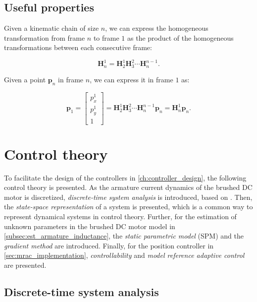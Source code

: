 \subsection*{Useful properties}

Given a kinematic chain of size $n$, we can express the homogeneous transformation from frame $n$ to frame $1$ as the product of the homogeneous transformations between each consecutive frame:

\begin{equation}
    \label{eq:theory_homogeneous_transformation_chain}
    \mathbf{H}_n^1 = \mathbf{H}_2^1 \mathbf{H}_3^2 \cdots \mathbf{H}_n^{n-1}.
\end{equation}

Given a point $\mathbf{p}_n$ in frame $n$, we can express it in frame $1$ as:

\begin{equation}
    \label{eq:theory_homogeneous_transformation_chain_application}
    \mathbf{p}_1 = \begin{bmatrix}
        p_x^1 \\
        p_y^1 \\
        1
    \end{bmatrix} = \mathbf{H}_2^1 \mathbf{H}_3^2 \cdots \mathbf{H}_n^{n-1} \mathbf{p}_n = \mathbf{H}_n^1 \mathbf{p}_n.
\end{equation}

\section{Control theory}%
\label{sec:theory_control}

To facilitate the design of the controllers in \cref{ch:controller_design}, the following control theory is presented. As the armature current dynamics of the brushed DC motor is discretized, \textit{discrete-time system analysis} is introduced, based on \cite{proakisDigitalSignalProcessing2014}. Then, the \textit{state-space representation} of a system is presented, which is a common way to represent dynamical systems in control theory. Further, for the estimation of unknown parameters in the brushed DC motor model in \cref{subsec:est_armature_inductance}, the \textit{static parametric model} (SPM) and the \textit{gradient method} are introduced. Finally, for the position controller in \cref{sec:mrac_implementation}, \textit{controllability} and \textit{model reference adaptive control} are presented.


\subsection{Discrete-time system analysis}
\label{subsec:theory_discrete_time_system_analysis}


